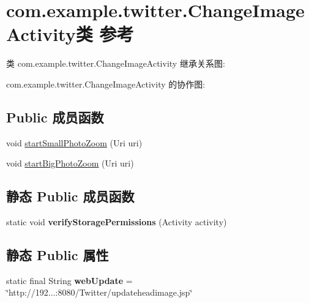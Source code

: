\hypertarget{classcom_1_1example_1_1twitter_1_1_change_image_activity}{}\section{com.\+example.\+twitter.\+Change\+Image\+Activity类 参考}
\label{classcom_1_1example_1_1twitter_1_1_change_image_activity}


类 com.\+example.\+twitter.\+Change\+Image\+Activity 继承关系图\+:


com.\+example.\+twitter.\+Change\+Image\+Activity 的协作图\+:
\subsection*{Public 成员函数}
\begin{DoxyCompactItemize}
\item 
void \mbox{\hyperlink{classcom_1_1example_1_1twitter_1_1_change_image_activity_a576defc71f577f4867afcf84f93ed3fd}{start\+Small\+Photo\+Zoom}} (Uri uri)
\item 
void \mbox{\hyperlink{classcom_1_1example_1_1twitter_1_1_change_image_activity_a575b294447ef1df91b48b8d7d22cf8e1}{start\+Big\+Photo\+Zoom}} (Uri uri)
\end{DoxyCompactItemize}
\subsection*{静态 Public 成员函数}
\begin{DoxyCompactItemize}
\item 
\mbox{\label{classcom_1_1example_1_1twitter_1_1_change_image_activity_a61abf5356003969df665b63e123fd510}} 
static void {\bfseries verify\+Storage\+Permissions} (Activity activity)
\end{DoxyCompactItemize}
\subsection*{静态 Public 属性}
\begin{DoxyCompactItemize}
\item 
\mbox{\label{classcom_1_1example_1_1twitter_1_1_change_image_activity_a1075a412961f4d4b553726c93ef12f56}} 
static final String {\bfseries web\+Update} = \char`\"{}http\+://192...\+:8080/Twitter/updateheadimage.\+jsp\char`\"{}
\end{DoxyCompactItemize}
